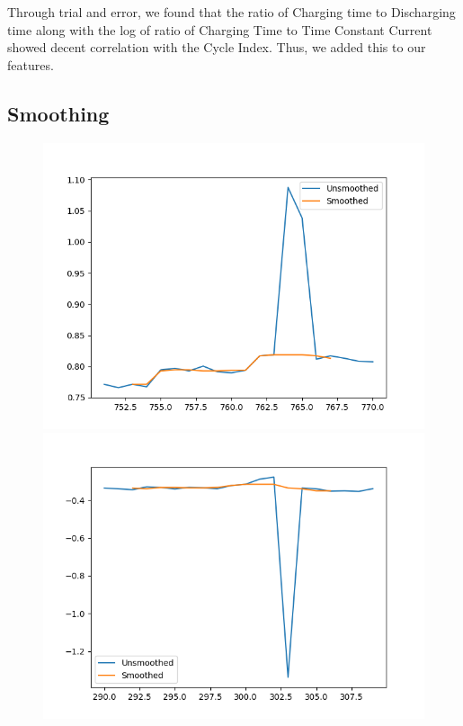 \documentclass[12pt]{article}
\begin{document}
			\footnotesize{Through trial and error, we found that the ratio of Charging time to Discharging time along with the log of ratio of Charging Time to Time Constant Current showed decent correlation with the Cycle Index. Thus, we added this to our features.}
		\subsection{Smoothing}
			\begin{figure}[h]
				\centering
				\begin{minipage}{0.32\textwidth}
					\centering
					\includegraphics[width=\textwidth]{imgs/smoothing_1.png}
				\end{minipage}
				\hfill
				\begin{minipage}{0.32\textwidth}
					\centering
					\includegraphics[width=\textwidth]{imgs/smoothing_2.png}

\end{minipage}
\end{figure}
\end{document}
